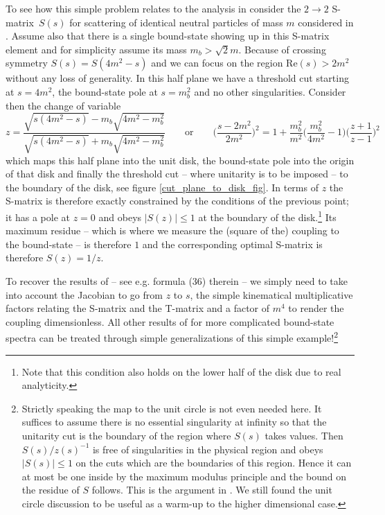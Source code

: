 \documentclass[12pt]{article}
\newcommand{\begBvR}[1]{\begin{#1}}
\newcommand{\beq}{\begBvR{equation}}
\newcommand{\eeq}{\end{equation}}
\newcommand{\<}{{\langle}}
\renewcommand{\>}{{\rangle}}
\begin{document}
To see how this simple problem relates to the analysis in \cite{paperII,Creutz} consider the $2\to2$ S-matrix~$S(s)$ for scattering of identical neutral particles of mass $m$ considered in \cite{paperII}. Assume also that there is a single bound-state showing up in this S-matrix element and for simplicity assume its mass $m_{b}>\sqrt{2}m$. Because of crossing symmetry $S(s)=S(4m^2-s)$ and we can focus on the region $\mbox{Re}(s)>2m^2$ without any loss of generality. In this half plane we have a threshold cut starting at $s=4m^2$, the bound-state pole at $s=m_b^2$ and no other singularities. Consider then the change of variable 
\beq  \label{cut_plane_to_disk}
z = \frac{\sqrt{s(4m^2-s)}-m_b\sqrt{4m^2-m_b^2}}{\sqrt{s(4m^2-s)}+m_b\sqrt{4m^2-m_b^2}} \qquad \text{or} \qquad \Big(\frac{s-2m^2}{2m^2}\Big)^{\!\!2} \!= 1+\frac{m_b^2}{m^2}{  \Big(\frac{m_b^2}{4m^2}-1 \Big)} \Big(\frac{z+1}{z-1}\Big)^2
\eeq
which maps this half plane into the unit disk, the bound-state pole into the origin of that disk and finally the threshold cut -- where unitarity is to be imposed -- to the boundary of the disk, see figure \ref{cut_plane_to_disk_fig}. In terms of $z$ the S-matrix is therefore exactly constrained by the conditions of the previous point; it has a pole at $z=0$ and obeys $|S(z)|\le 1$ at the boundary of the disk.\footnote{Note that this condition also holds on the lower half of the disk due to real analyticity.} Its maximum residue -- which is where we measure the (square of the) coupling to the bound-state -- is therefore $1$ and the corresponding optimal S-matrix is therefore $S(z)=1/z$. 

To recover the results of \cite{paperII} -- see e.g. formula (36) therein -- we simply need to take into account the Jacobian to go from $z$ to $s$, the simple kinematical multiplicative factors relating the S-matrix and the T-matrix and a factor of $m^4$ to render the coupling dimensionless. All other results of \cite{paperII} for more complicated bound-state spectra can be treated through simple generalizations of this simple example!\footnote{Strictly speaking the map to the unit circle is not even needed here. It suffices to assume there is no essential singularity at infinity so that the unitarity cut is the boundary of the region where $S(s)$ takes values. Then $S(s)/z(s)^{-1}$ is free of singularities in the physical region and obeys $|S(s)|\le 1$ on the cuts which are the boundaries of this region. Hence it can at most be one inside by the maximum modulus principle and the bound on the residue of $S$ follows. This is the argument in \cite{Creutz}. We still found the unit circle discussion to be useful as a warm-up to the higher dimensional case.} 
\end{document}
